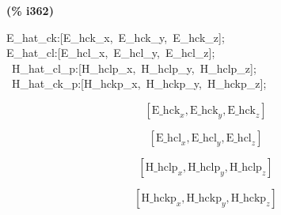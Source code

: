 \documentclass[fleqn]{article}
\begin{document}
\noindent
\begin{minipage}[t]{4.000000em}\color{red}\bfseries
(\% i362)	
\end{minipage}
\begin{minipage}[t]{\textwidth}\color{blue}
E\_hat\_ck:[E\_hck\_x,\ E\_hck\_y,\ E\_hck\_z];\\
E\_hat\_cl:[E\_hcl\_x,\ E\_hcl\_y,\ E\_hcl\_z];\\
\ H\_hat\_cl\_p:[H\_hclp\_x,\ H\_hclp\_y,\ H\_hclp\_z];\\
\ H\_hat\_ck\_p:[H\_hckp\_x,\ H\_hckp\_y,\ H\_hckp\_z];
\end{minipage}
\[\displaystyle \tag{\% o359} 
\left[ {{\ensuremath{\mathrm{E\_ hck}}}_x}\operatorname{,}{{\ensuremath{\mathrm{E\_ hck}}}_y}\operatorname{,}{{\ensuremath{\mathrm{E\_ hck}}}_z}\right] \mbox{}\]

\[\tag{\% o360} 
\left[ {{\ensuremath{\mathrm{E\_ hcl}}}_x}\operatorname{,}{{\ensuremath{\mathrm{E\_ hcl}}}_y}\operatorname{,}{{\ensuremath{\mathrm{E\_ hcl}}}_z}\right] \mbox{}\]

\[\tag{\% o361} 
\left[ {{\ensuremath{\mathrm{H\_ hclp}}}_x}\operatorname{,}{{\ensuremath{\mathrm{H\_ hclp}}}_y}\operatorname{,}{{\ensuremath{\mathrm{H\_ hclp}}}_z}\right] \mbox{}\]

\[\tag{\% o362} 
\left[ {{\ensuremath{\mathrm{H\_ hckp}}}_x}\operatorname{,}{{\ensuremath{\mathrm{H\_ hckp}}}_y}\operatorname{,}{{\ensuremath{\mathrm{H\_ hckp}}}_z}\right] \mbox{}
\]
\end{document}
